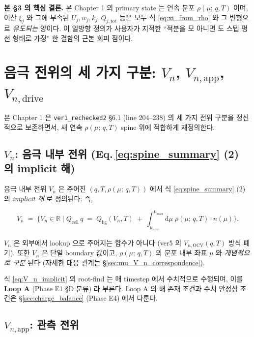 \documentclass[11pt,a4paper]{article}
\newcommand{\dd}{\mathrm{d}}
\newcommand{\OCV}{\mathrm{OCV}}
\newcommand{\app}{\mathrm{app}}
\newcommand{\drive}{\mathrm{drive}}
\newcommand{\tot}{\mathrm{tot}}
\newcommand{\bg}{\mathrm{bg}}
\newcommand{\cell}{\mathrm{cell}}
\newcommand{\mucont}{\mu}
\newcommand{\rhomu}{\rho(\mucont;\, q, T)}
\newcommand{\nmu}{n(\mucont)}
\begin{document}
\textbf{본 \S 3 의 핵심 결론.} 본 Chapter 1 의 primary state 는 연속 분포 $\rhomu$
이며, 이산 $\xi_j$ 와 그에 부속된 $U_j, w_j, k_j, Q_{j,\tot}$ 등은 모두 식
\eqref{eq:xi_from_rho} 와 그 변형으로 \emph{유도되는} 양이다. 이 일방향 정의가
사용자가 지적한 ``적분을 모 아니면 도 스텝 펑션 형태로 가정'' 한 결함의 근본 회피
점이다.

\section{음극 전위의 세 가지 구분: $V_n$, $V_{n,\app}$, $V_{n,\drive}$}
\label{sec:three_potentials}

본 Chapter 1 은 \texttt{ver1\_rechecked2} \S 6.1 (line 204--238) 의 세 가지 전위
구분을 정신적으로 보존하면서, 새 연속 $\rhomu$ spine 위에 적합하게 재정의한다.

\subsection{$V_n$: 음극 내부 전위 (Eq.\,\ref{eq:spine_summary} (2) 의 implicit 해)}
\label{sec:V_n_internal}

음극 내부 전위 $V_n$ 은 주어진 $(q, T, \rhomu)$ 에서 식 \eqref{eq:spine_summary} (2)
의 \emph{implicit 해} 로 정의된다. 즉,

\begin{equation}
V_n
\;=\;
\bigl\{
V_n \in \mathbb{R} \;\big|\;
Q_{\cell}\, q
\;=\;
Q_{\bg}(V_n, T)
\;+\;
\int_{\mucont_{\min}}^{\mucont_{\max}} \dd\mucont \;
\rhomu \cdot \nmu
\bigr\}.
\label{eq:V_n_implicit}
\end{equation}

$V_n$ 은 외부에서 lookup 으로 주어지는 함수가 아니다 (ver5 의 $V_{n,\OCV}(q, T)$
방식 폐기). 또한 $V_n$ 은 단일 boundary 값이고, $\rhomu$ 의 분포 내부 좌표
$\mucont$ 와 \emph{개념적으로 구분} 된다 (자세한 대응 관계는
\S\ref{sec:mu_V_n_correspondence}).

식 \eqref{eq:V_n_implicit} 의 root-find 는 매 timestep 에서 수치적으로 수행되며,
이를 \textbf{Loop A} (Phase E1 \S D 분류) 라 부른다. Loop A 의 해 존재 조건과
수치 안정성 조건은 \S\ref{sec:charge_balance} (Phase E4) 에서 다룬다.

\subsection{$V_{n,\app}$: 관측 전위}
\label{sec:V_n_app}
\end{document}
